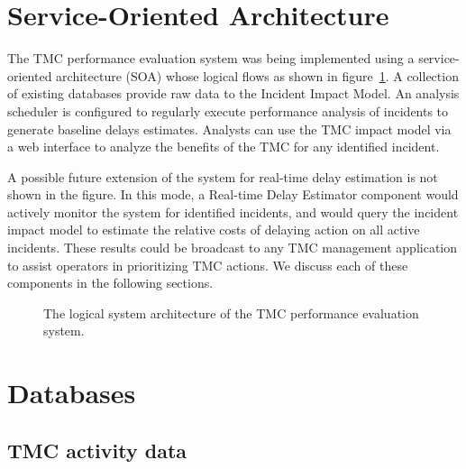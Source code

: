 \documentclass[12pt]{report}
\newcommand{\inputTikZ}[1]{%
    \begin{singlespace}
    \end{singlespace}
  }
\newcommand{\inputTikZ}[1]{%
    \begin{singlespace}
    \beginpgfgraphicnamed{#1-external}%
    \endpgfgraphicnamed%
    \end{singlespace}
  }
\newcounter{time}
\newcounter{space}
\begin{document}
\section{Service-Oriented Architecture}
\label{sec:soa}

The \ac{TMC} performance evaluation system was being implemented using a
service-oriented architecture (SOA) whose logical flows as shown in
figure~\ref{fig:logical-system-arch}. A collection of existing databases provide
raw data to the Incident Impact Model.  An analysis scheduler is configured to
regularly execute performance analysis of incidents to generate baseline delays
estimates.  Analysts can use the \ac{TMC} impact model via a web interface to
analyze the benefits of the \ac{TMC} for any identified incident.

A possible future extension of the system for real-time delay estimation is not
shown in the figure. In this mode, a Real-time Delay Estimator component would
actively monitor the system for identified incidents, and would query the
incident impact model to estimate the relative costs of delaying action on all
active incidents. These results could be broadcast to any \ac{TMC} management
application to assist operators in prioritizing \ac{TMC} actions.  We discuss
each of these components in the following sections.
\begin{figure}[t]
  \begin{center}
    \inputTikZ{figs/status}
    \caption{The logical system architecture of the TMC performance evaluation
      system.  }
    \label{fig:logical-system-arch}
  \end{center}
\end{figure}



\section{Databases}
\label{sec:databases}

\subsection{TMC activity data}
\label{sec:activity-data}
\end{document}
